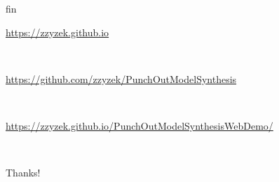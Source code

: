 \documentclass{beamer}
\begin{document}

  \begin{frame}[fragile]{fin}
    \begin{center}\url{https://zzyzek.github.io}\end{center}
    \hfill \\
    \begin{center}\url{https://github.com/zzyzek/PunchOutModelSynthesis}\end{center}
    \hfill \\
    \begin{center}\small\url{https://zzyzek.github.io/PunchOutModelSynthesisWebDemo/}\end{center}
    \hfill \\
    \begin{center}Thanks!\end{center}
  \end{frame}

  \appendix
\end{document}
